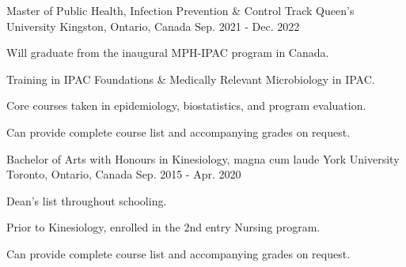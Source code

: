 

\begin{cventries}

  \cventry
    {Master of Public Health, Infection Prevention \& Control Track} %
    {Queen's University} %
    {Kingston, Ontario, Canada} %
    {Sep. 2021 - Dec. 2022} %
    {
      \begin{cvitems} %
        \item {Will graduate from the inaugural MPH-IPAC program in Canada.}
        \item {Training in IPAC Foundations \& Medically Relevant Microbiology in IPAC.}
        \item {Core courses taken in epidemiology, biostatistics, and program evaluation.}
        \item {Can provide complete course list and accompanying grades on request.}
      \end{cvitems}      
    }

  \cventry
    {Bachelor of Arts with Honours in Kinesiology, magna cum laude} %
    {York University} %
    {Toronto, Ontario, Canada} %
    {Sep. 2015 - Apr. 2020} %
    {
      \begin{cvitems} %
        \item {Dean's list throughout schooling.}
        \item {Prior to Kinesiology, enrolled in the 2nd entry Nursing program.}
        \item {Can provide complete course list and accompanying grades on request.}
      \end{cvitems}
    }

\end{cventries}
